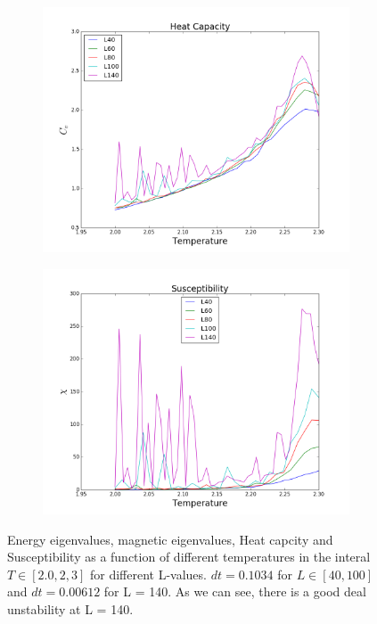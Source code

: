 \documentclass{article}
\begin{document}
\begin{figure}[H]
\begin{subfigure}{0.49 \textwidth}
\includegraphics[scale=0.29]{../figures/task_e/sigmaE.png}
\label{fig:cEeig}
\end{subfigure}
\begin{subfigure}{0.49 \textwidth}
\centering
\includegraphics[scale=0.29]{../figures/task_e/suscept.png}
\label{fig:cMeig}
\end{subfigure}
\caption{Energy eigenvalues, magnetic eigenvalues, Heat capcity and Susceptibility as a function of different temperatures in the interal $T \in [2.0, 2,3]$ for different L-values. $dt = 0.1034$ for $L \in [40, 100]$ and $dt = 0.00612$ for L = 140. As we can see, there is a good deal unstability at L = 140.}
\label{fig:e}
\end{figure}
\end{document}
